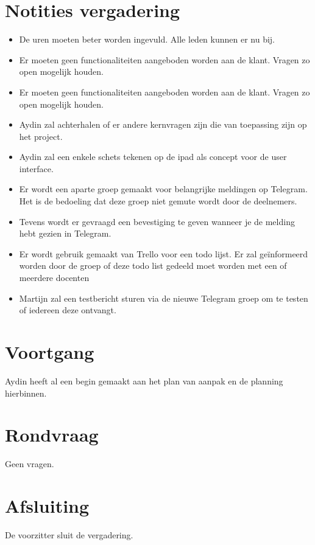 \documentclass[dutch]{hu}
\begin{document}
\section{Notities vergadering}
\begin{itemize}

\item De uren moeten beter worden ingevuld. Alle leden kunnen er nu bij.

\item  Er moeten geen functionaliteiten aangeboden worden aan de klant. Vragen zo open mogelijk houden.

\item  Er moeten geen functionaliteiten aangeboden worden aan de klant. Vragen zo open mogelijk houden.

\item Aydin zal achterhalen of er andere kernvragen zijn die van toepassing zijn op het project.

\item Aydin zal een enkele schets tekenen op de ipad als concept voor de user interface.

\item Er wordt een aparte groep gemaakt voor belangrijke meldingen op Telegram. Het is de bedoeling dat deze groep niet gemute wordt door de deelnemers.

\item Tevens wordt er gevraagd een bevestiging te geven wanneer je de melding hebt gezien in Telegram.

\item Er wordt gebruik gemaakt van Trello voor een todo lijst. Er zal geïnformeerd worden door de groep of deze todo list gedeeld moet worden met een of meerdere docenten

\item Martijn zal een testbericht sturen via de nieuwe Telegram groep om te testen of iedereen deze ontvangt.


\end{itemize}
\newpage
\section{Voortgang}
Aydin heeft al een begin gemaakt aan het plan van aanpak en de planning hierbinnen.

\section{Rondvraag}
Geen vragen.

\section{Afsluiting}
De voorzitter sluit de vergadering.
\end{document}
